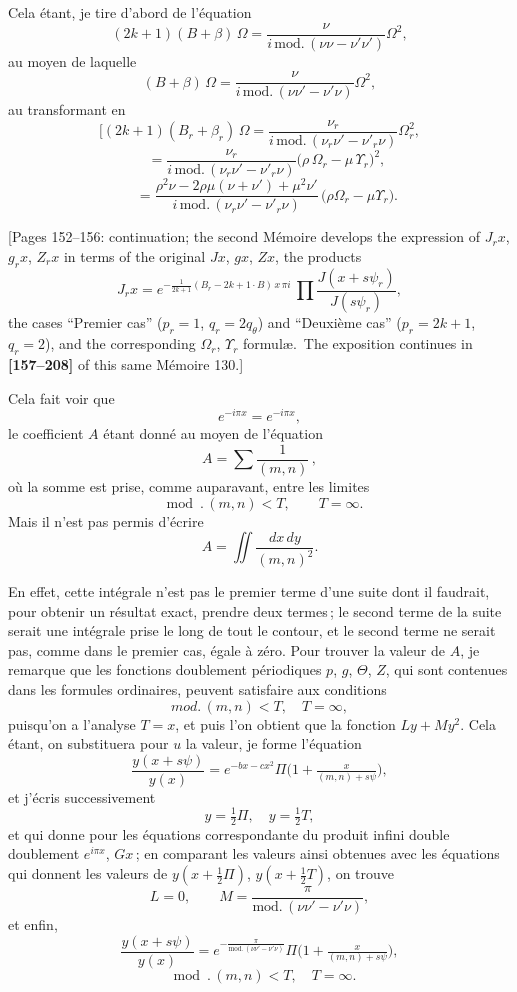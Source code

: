 \documentclass[11pt,a4paper]{book}
\begin{document}
\medskip

Cela \'etant, je tire d'abord de l'\'equation
\[
(2k+1)(B+\beta)\,\Omega = \frac{\nu}{i\,\text{mod.}\,(\nu\nu - \nu'\nu')}\Omega^2,
\]
au moyen de laquelle
\[
(B+\beta)\,\Omega = \frac{\nu}{i\,\text{mod.}\,(\nu\nu' - \nu'\nu)}\Omega^2,
\]
au transformant en
\[
[(2k+1)(B_r+\beta_r)\,\Omega = \frac{\nu_r}{i\,\text{mod.}\,(\nu_r\nu' - \nu'_r\nu)}\Omega_r^2,
\]
\[
\quad= \frac{\nu_r}{i\,\text{mod.}\,(\nu_r\nu' - \nu'_r\nu)}\bigl(\rho\,\Omega_r - \mu\,\Upsilon_r\bigr)^2,
\]
\[
\quad= \frac{\rho^2\nu - 2\rho\mu(\nu+\nu') + \mu^2\nu'}{i\,\text{mod.}\,(\nu_r\nu' - \nu'_r\nu)}\,\bigl(\rho\Omega_r - \mu\Upsilon_r\bigr).
\]

\medskip

[Pages 152--156: continuation; the second M\'emoire develops the
expression of $J_r x$, $g_r x$, $Z_r x$ in terms of the original
$J x$, $g x$, $Z x$, the products
\[
J_r x = e^{-\frac{1}{2k+1}(B_r - 2k+1 \cdot B)\,x\,\pi i}\,
\prod \frac{J(x + s\psi_r)}{J(s\psi_r)},
\]
the cases ``Premier cas'' ($p_r=1$, $q_r=2 q_\theta$) and
``Deuxi\`eme cas'' ($p_r = 2k+1$, $q_r = 2$), and the corresponding
$\Omega_r$, $\Upsilon_r$ formul\ae.\ The exposition continues in
\textbf{[157--208]} of this same M\'emoire 130.]

\medskip

Cela fait voir que
\[
e^{-i\pi x} = e^{-i\pi x},
\]
le coefficient $A$ \'etant donn\'e au moyen de l'\'equation
\[
A = \sum \frac{1}{(m, n)}\,,
\]
o\`u la somme est prise, comme auparavant, entre les limites
\[
\mod.\,(m, n) < T, \qquad T = \infty.
\]
Mais il n'est pas permis d'\'ecrire
\[
A = \iint \frac{dx\,dy}{(m, n)^2}.
\]

\medskip

En effet, cette int\'egrale n'est pas le premier terme d'une suite dont il faudrait,
pour obtenir un r\'esultat exact, prendre deux termes\,; le second terme de la suite serait
une int\'egrale prise le long de tout le contour, et le second terme ne serait pas, comme
dans le premier cas, \'egale \`a z\'ero. Pour trouver la valeur de $A$, je remarque que les
fonctions doublement p\'eriodiques $p$, $g$, $\Theta$, $Z$, qui sont contenues dans les formules
ordinaires, peuvent satisfaire aux conditions
\[
mod.\,(m,n) < T,\quad T = \infty,
\]
puisqu'on a l'analyse $T = x$, et puis l'on obtient que la fonction $L y + M y^2$. Cela
\'etant, on substituera pour $u$ la valeur, je forme l'\'equation
\[
\frac{y(x+s\psi)}{y(x)} = e^{-bx-cx^2}\Pi\bigl(1+\tfrac{x}{(m,n)+s\psi}\bigr),
\]
et j'\'ecris successivement
\[
y = \tfrac{1}{2}\Pi,\quad y = \tfrac{1}{2}T,
\]
et qui donne pour les \'equations correspondante du produit infini double doublement
$e^{i\pi x}$, $G x$\,; en comparant les valeurs ainsi obtenues avec les \'equations qui donnent les
valeurs de $y(x+\tfrac{1}{2}\Pi)$, $y(x+\tfrac{1}{2}T)$, on trouve
\[
L = 0,\qquad M = \frac{\pi}{\text{mod.}\,(\nu\nu' - \nu'\nu)},
\]
et enfin,
\[
\frac{y(x+s\psi)}{y(x)} = e^{-\frac{\pi}{\text{mod.}\,(\nu\nu' - \nu'\nu)}}\Pi\bigl(1+\tfrac{x}{(m,n)+s\psi}\bigr),
\]
\[
\mod.\,(m, n)<T,\quad T = \infty.
\]
\end{document}
